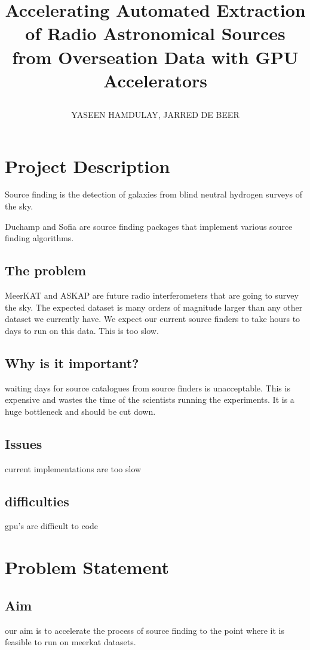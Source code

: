 \documentclass[prodmode,acmtecs]{acmsmall} \usepackage[ruled]{algorithm2e}
\begin{document}
\title{Accelerating Automated Extraction of Radio Astronomical Sources from Overseation Data with GPU Accelerators
\author{YASEEN HAMDULAY, JARRED DE BEER}
}

\maketitle{}

\section{Project Description}

Source finding is the detection of galaxies from blind neutral hydrogen surveys of the sky.

Duchamp and Sofia are source finding packages that implement various source finding algorithms.

\subsection{The problem}
MeerKAT and ASKAP are future radio interferometers that are going to survey the sky.
The expected dataset is many orders of magnitude larger than any other dataset we currently have.
We expect our current source finders to take hours to days to run on this data. This is too slow.

\subsection{Why is it important?}
waiting days for source catalogues from source finders is unacceptable. 
This is expensive and wastes the time of the scientists running the experiments. It is a huge
bottleneck and should be cut down.

\subsection{Issues} 
current implementations are too slow
\subsection{difficulties} 
gpu's are difficult to code

\section{Problem Statement}

\subsection{Aim} our aim is to accelerate the process of source finding to the point where it is feasible
to run on meerkat datasets.     
\end{document}
